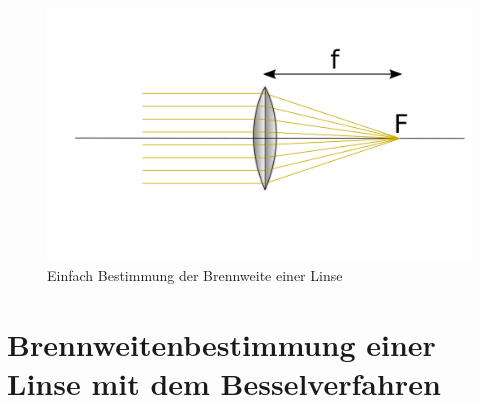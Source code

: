 \begin{figure}
    \centering
    \includegraphics[scale=0.8]{Geometrische_Optik/Protokoll/fig/Versuch1.1.png}
    \caption{Einfach Bestimmung der Brennweite einer Linse}
    \label{fig:Versuch1.1}
\end{figure}

\section{Brennweitenbestimmung einer Linse mit dem Besselverfahren}

